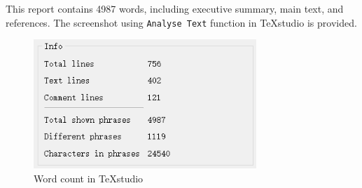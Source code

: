 \documentclass[11pt,twoside]{article}
\numberwithin{Theorem}{section}
\numberwithin{Definition}{section}
\numberwithin{Lemma}{section}
\numberwithin{Algorithm}{section}
\numberwithin{equation}{section}
\begin{document}
This report contains 4987 words, including executive summary, main text, and references. The screenshot using \texttt{Analyse Text} function in TeXstudio is provided.

\begin{figure}[!h]
	\centering
	\includegraphics[width = 0.75\textwidth]{Images/wordcount.png}
	\caption{Word count in TeXstudio}
	\label{fig:wordcount}
\end{figure}
\end{document}
